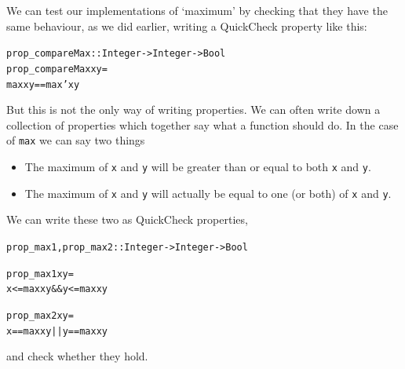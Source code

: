 We can test our implementations of `maximum' by checking that they have the same behaviour, as we did earlier, writing a QuickCheck property like this:
\begin{alltt}
prop_compareMax :: Integer -> Integer -> Bool
prop_compareMax x y =
    max x y == max' x y
\end{alltt}
But this is not the only way of writing properties. We can often write down a collection of properties which together say what a function should do. In the case of \texttt{max} we can say two things
\begin{itemize}
\item
The maximum of \texttt{x} and \texttt{y} will be greater than or equal to both \texttt{x} and \texttt{y}.
\item
The maximum of \texttt{x} and \texttt{y} will actually be equal to one (or both) of  \texttt{x} and \texttt{y}.
\end{itemize}  
We can write these two as QuickCheck properties, 
\begin{alltt}
prop_max1, prop_max2 :: Integer -> Integer -> Bool

prop_max1 x y =
    x <= max x y && y <= max x y

prop_max2 x y =
    x == max x y || y == max x y
\end{alltt}
and check whether they hold. 

\begin{figure}[t]
\end{figure}



